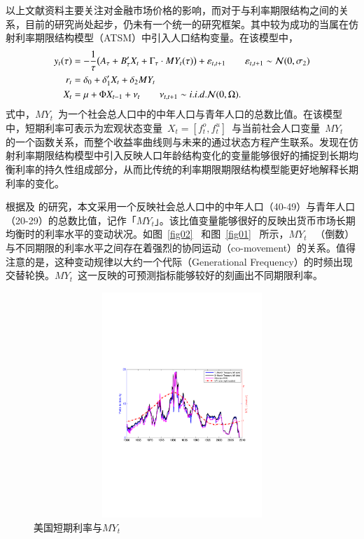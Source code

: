 以上文献资料主要关注\dsf 对金融市场价格的影响，而对于\dsf 与利率期限结构之间的关系，目前的研究尚处起步，仍未有一个统一的研究框架。其中较为成功的当属在仿射利率期限结构模型（ATSM）中引入人口结构变量。在该模型中，
\begin{align*}
  y_t(\tau) &= -\frac{1}{\tau} \big( A_{\tau} + B_{\tau}' X_t + \Gamma_{\tau} \cdot MY_t(\tau) \big) + \varepsilon_{t,t+1} \qquad \varepsilon_{t,t+1} \sim \mathcal{N}(0,\sigma_2) \\
  r_t &= \delta_0 + \delta_1' X_t + \delta_2 MY_t  \\
  X_t &= \mu + \Phi X_{t-1} + \nu_t  \qquad \nu_{t,t+1} \sim i.i.d. \mathcal{N}(0,\Omega).
\end{align*}
式中，$MY_t$~为一个社会总人口中的中年人口与青年人口的总数比值。在该模型中，短期利率可表示为宏观状态变量~$X_t=[f_t^o,f_t^u]$~与当前社会人口变量~$MY_t$~ 的一个函数关系，而整个收益率曲线则与未来的\dsf 通过状态方程产生联系。发现在仿射利率期限结构模型中引入反映人口年龄结构变化的变量能够很好的捕捉到长期均衡利率的持久性组成部分，从而比传统的利率期限期限结构模型能更好地解释长期利率的变化。

根据及 的研究，本文采用一个反映社会总人口中的中年人口（40-49）与青年人口（20-29）的总数比值，记作「$MY_t$」。该比值变量能够很好的反映出货币市场长期均衡时的利率水平的变动状况。如图~\eqref{fig02}~ 和图~\eqref{fig01}~ 所示，$MY_t$~ （倒数）与不同期限的利率水平之间存在着强烈的协同运动（co-movement）的关系。值得注意的是，这种变动规律以大约一个代际（Generational Frequency）的时频出现交替轮换。$MY_t$~这一反映\dsf 的可预测指标能够较好的刻画出不同期限利率。%

  \begin{figure}[!h]
    \includegraphics[width=15cm,height=8.5cm]{figures/fig02}
    \caption{美国短期利率与$MY_t$}    \label{fig02}
  \end{figure}

